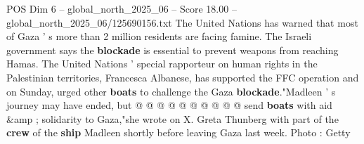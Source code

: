 \begin{textsample}{POS Dim 6 – global\_north\_2025\_06 – Score 18.00 – global\_north\_2025\_06/125690156.txt}
The United Nations has warned that most of Gaza ' s more than 2 million residents are facing famine.
The Israeli government says the \textbf{blockade} is essential to prevent weapons from reaching Hamas.
The United Nations ' special rapporteur on human rights in the Palestinian territories, Francesca Albanese, has supported the FFC operation and on Sunday, urged other \textbf{boats} to challenge the Gaza \textbf{blockade}."Madleen ' s journey may have ended, but @ @ @ @ @ @ @ @ @ @ send \textbf{boats} with aid \&amp ; solidarity to Gaza,"she wrote on X.
Greta Thunberg with part of the \textbf{crew} of the \textbf{ship} Madleen shortly before leaving Gaza last week.
Photo : Getty

\end{textsample}

